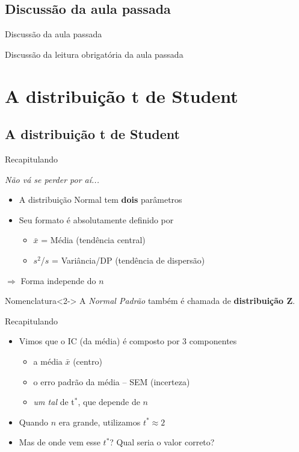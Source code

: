\documentclass{beamer}
\begin{document}
\subsection{Discussão da aula passada}

\begin{frame}{Discussão da aula passada}
  \begin{block}{}
    Discussão da leitura obrigatória da aula passada
  \end{block}
\end{frame}

\section[t de Student]{A distribuição t de Student}

\subsection{A distribuição t de Student}

\begin{frame}{Recapitulando}
  \begin{block}{\em Não vá se perder por aí...}
    \begin{itemize}
    \item A distribuição Normal tem {\bf dois} parâmetros
    \item Seu formato é absolutamente definido por
      \begin{itemize}
      \item $\bar{x}$ = Média {\tiny (tendência central)}
      \item $s^2$/$s$ = Variância/DP {\tiny (tendência de dispersão)}
      \end{itemize}
    \end{itemize}
    \begin{center}
      $\Rightarrow$ Forma \alert{independe} do $n$
    \end{center}
  \end{block}
  \begin{block}{Nomenclatura}<2->
    \small
    A {\em Normal Padrão} também é chamada de {\bf distribuição Z}.
  \end{block}
\end{frame}

\begin{frame}{Recapitulando}
  \begin{itemize}
  \item Vimos que o IC {\tiny(da média)} é composto por 3 componentes
    \begin{itemize}
    \item a média $\bar{x}$ {\tiny(centro)}
    \item o erro padrão da média -- SEM {\tiny(incerteza)}
    \item {\em um tal} de t$^{*}$, que depende de $n$
    \end{itemize}
  \item Quando $n$ era grande, utilizamos $t^{*} \approx 2$
    \bigskip
  \item Mas de onde vem esse $t^{*}$? Qual seria o valor \alert{correto}?
  \end{itemize}
\end{frame}
\end{document}
